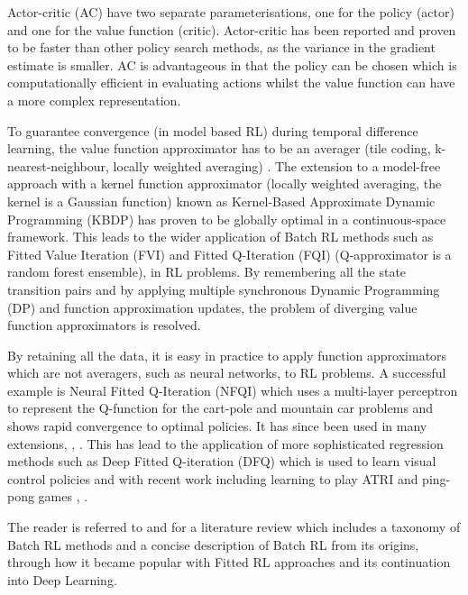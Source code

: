 \documentclass[final,5p,times,twocolumn]{elsarticle}
\begin{document}
Actor-critic (AC) \cite[Chap. 6.6]{sutton1998reinforcement} have two separate parameterisations, one for the policy (actor) and
one for the value function (critic). Actor-critic has been reported and proven \cite{rl_ac_surv_2012} to be faster than other policy 
search methods, as the variance in the gradient estimate is smaller. AC is advantageous in that the policy can be chosen which 
is computationally efficient in evaluating actions whilst the value function can have a more complex representation.

To guarantee convergence (in model based RL) during temporal difference learning, 
the value function approximator has to be an averager (tile coding, k-nearest-neighbour, locally weighted averaging) 
\cite{stable_FA_gordon_1995}. The extension to a model-free approach with a kernel function approximator 
(locally weighted averaging, the kernel is a Gaussian function) known as Kernel-Based Approximate Dynamic Programming (KBDP) \cite{kernel_rl_ormoneit_2002}
has proven to be globally optimal in a continuous-space framework. This leads to the wider application of Batch RL methods 
such as Fitted Value Iteration (FVI) \cite{fvi_uav_2010} and Fitted Q-Iteration (FQI) \cite{EGW05} (Q-approximator is a random forest ensemble),
\cite{fqi_nips_peter_2009} in RL problems. By remembering all the state transition pairs and by applying multiple 
synchronous Dynamic Programming (DP) and function approximation updates, the problem of diverging value function approximators is resolved. 

By retaining all the data, it is easy in practice to apply function approximators which are not averagers, such as neural networks,
to RL problems. A successful example is Neural Fitted Q-Iteration (NFQI) \cite{Riedmiller2005} which 
uses a multi-layer perceptron to represent the Q-function for the cart-pole and mountain car problems and 
shows rapid convergence to optimal policies. It has since been used in many extensions, \cite{NAC_2008}, \cite{rl_gmm_2010}.
This has lead to the application of more sophisticated regression methods such as 
Deep Fitted Q-iteration (DFQ) \cite{Lange_riedmiller_2010} which is used to learn visual control policies
and with recent work including learning to play ATRI and ping-pong games \cite{mnih-dqn-2015}, \cite{DRQ_AAAI_2015}. 

The reader is referred to \cite{approx_rl_overview_2011} and \cite[Chap 2]{RL_state_art_2012} for a literature 
review which includes a taxonomy of Batch RL methods and a concise description of Batch RL from its origins, 
through how it became popular with Fitted RL approaches and its continuation into Deep Learning.
\end{document}
